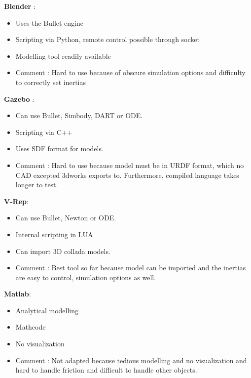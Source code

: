 \textbf{Blender\cite{Bruyninckx04}
} : \begin{itemize}
\item Uses the Bullet engine
\item Scripting via Python, remote control possible through socket
\item Modelling tool readily available
\item Comment : Hard to use because of obscure simulation options and difficulty to correctly set inertias
\end{itemize}

\textbf{Gazebo} : \begin{itemize}
\item Can use Bullet, Simbody, DART or ODE.
\item Scripting via C++
\item Uses SDF format for models.
\item Comment : Hard to use because model must be in URDF format, which no CAD excepted 3dworks exports to. Furthermore, compiled language takes longer to test.
\end{itemize}

\textbf{V-Rep}: \begin{itemize}
\item Can use Bullet, Newton or ODE.
\item Internal scripting in LUA
\item Can import 3D collada models.
\item Comment : Best tool so far because model can be imported and the inertias are easy to control, simulation options as well.
\end{itemize}

\textbf{Matlab}: \begin{itemize}
\item Analytical modelling
\item Mathcode
\item No visualization
\item Comment : Not adapted because tedious modelling and no visualization and hard to handle friction and difficult to handle other objects.
\end{itemize}

